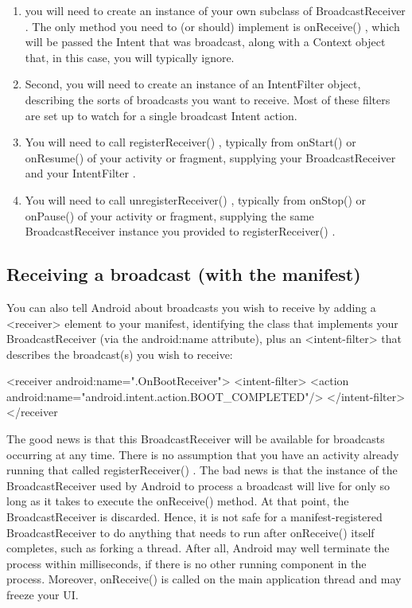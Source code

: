 \begin{enumerate}
	\item you will need to create an instance of your own subclass of
	BroadcastReceiver . The only method you need to (or should) implement is
	onReceive() , which will be passed the Intent that was broadcast, along with a
	Context object that, in this case, you will typically ignore. 
	\item Second, you will need to create an instance of an IntentFilter object, describing
	the sorts of broadcasts you want to receive. Most of these filters are set up to watch
	for a single broadcast Intent action.
	\item You will need to call registerReceiver() , typically from onStart() or onResume() of your
	activity or fragment, supplying your BroadcastReceiver and your IntentFilter .
	\item You will need to call unregisterReceiver() , typically from onStop() or onPause() of your
	activity or fragment, supplying the same BroadcastReceiver instance you provided
	to registerReceiver() .
\end{enumerate}

\subsection{Receiving a broadcast (with the manifest)}
You can also tell Android about broadcasts you wish to receive by adding a
<receiver> element to your manifest, identifying the class that implements your
BroadcastReceiver (via the android:name attribute), plus an <intent-filter> that
describes the broadcast(s) you wish to receive:

\begin{xml}
<receiver android:name=".OnBootReceiver">
	<intent-filter>
		<action android:name="android.intent.action.BOOT_COMPLETED"/>
	</intent-filter>
</receiver
\end{xml}
The good news is that this BroadcastReceiver will be available for broadcasts
occurring at any time. There is no assumption that you have an activity already
running that called registerReceiver() .
The bad news is that the instance of the BroadcastReceiver used by Android to
process a broadcast will live for only so long as it takes to execute the onReceive()
method. At that point, the BroadcastReceiver is discarded. Hence, it is not safe for
a manifest-registered BroadcastReceiver to do anything that needs to run after onReceive()
itself completes, such as forking a thread. After all, Android may well
terminate the process within milliseconds, if there is no other running component
in the process. Moreover, onReceive() is called on the main application thread and may freeze your UI.


